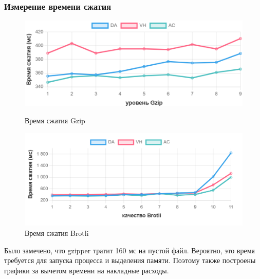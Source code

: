 \documentclass[12pt]{article}
\begin{document}
\subsubsection{Измерение времени сжатия}

\begin{figure}[H]
    \centering
    \begin{minipage}{0.48\textwidth}
        \centering
        \includegraphics[width=\linewidth]{../images/Gzip comp time (mean).png}
        \caption{Время сжатия Gzip}
        \label{fig:image1}
    \end{minipage}
    \hfill
    \begin{minipage}{0.48\textwidth}
        \centering
        \includegraphics[width=\linewidth]{../images/Brotli comp time (mean).png}
        \caption{Время сжатия Brotli}
        \label{fig:image2}
    \end{minipage}
\end{figure}

Было замечено, что gzipper тратит 160 мс на пустой файл. Вероятно,
это время требуется для запуска процесса и выделения памяти. Поэтому также построены графики за вычетом времени на накладные расходы.
\end{document}
